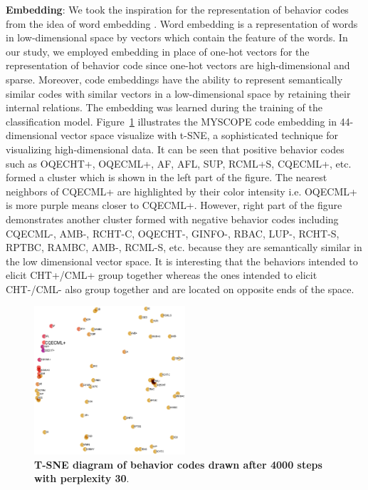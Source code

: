 \documentclass{amia_summit_2018}
\begin{document}
\textbf {Embedding}: We took the inspiration for the representation of behavior codes from the idea of word embedding \cite{bengio2003neural}. Word embedding is a representation of words in low-dimensional space by vectors which contain the feature of the words. In our study, we employed embedding in place of one-hot vectors for the representation of behavior code since one-hot vectors are high-dimensional and sparse. Moreover, code embeddings have the ability to represent semantically similar codes with similar vectors in a low-dimensional space by retaining their internal relations. The embedding was learned during the training of the classification model. Figure~\ref{fig:code_embedding} illustrates the MYSCOPE code embedding in 44-dimensional vector space visualize with t-SNE, a sophisticated technique for visualizing high-dimensional data. It can be seen that positive behavior codes such as OQECHT+, OQECML+, AF, AFL, SUP, RCML+S, CQECML+, etc. formed a cluster which is shown in the left part of the figure. The nearest neighbors of CQECML+ are highlighted by their color intensity i.e. OQECML+ is more purple means closer to CQECML+. However, right part of the figure demonstrates another cluster formed with negative behavior codes including CQECML-, AMB-, RCHT-C, OQECHT-, GINFO-, RBAC, LUP-, RCHT-S, RPTBC, RAMBC, AMB-, RCML-S, etc. because they are semantically similar in the low dimensional vector space. It is interesting that the behaviors intended to elicit CHT+/CML+ group together whereas the ones intended to elicit CHT-/CML- also group together and are located on opposite ends of the space. 
    
\begin{figure}[!htb]
    \centering
    \includegraphics[width=0.50\textwidth]{figures/code_embed.eps}
    \caption{\textbf{T-SNE diagram of behavior codes drawn after 4000 steps with perplexity 30}.}
    \label{fig:code_embedding}
\end{figure}
\end{document}
